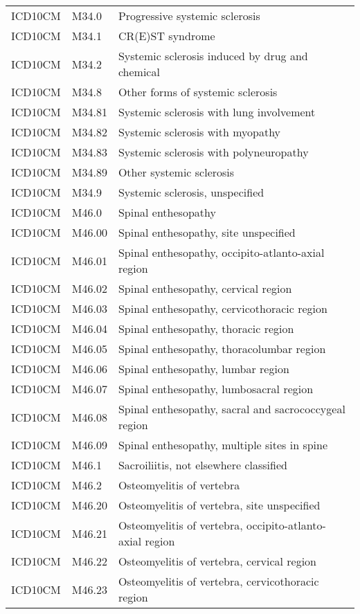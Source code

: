 \begin{table}[ht]
\begin{tabular}{lll}
  ICD10CM & M34.0 & Progressive systemic sclerosis \\ 
  ICD10CM & M34.1 & CR(E)ST syndrome \\ 
  ICD10CM & M34.2 & Systemic sclerosis induced by drug and chemical \\ 
  ICD10CM & M34.8 & Other forms of systemic sclerosis \\ 
  ICD10CM & M34.81 & Systemic sclerosis with lung involvement \\ 
  ICD10CM & M34.82 & Systemic sclerosis with myopathy \\ 
  ICD10CM & M34.83 & Systemic sclerosis with polyneuropathy \\ 
  ICD10CM & M34.89 & Other systemic sclerosis \\ 
  ICD10CM & M34.9 & Systemic sclerosis, unspecified \\ 
  ICD10CM & M46.0 & Spinal enthesopathy \\ 
  ICD10CM & M46.00 & Spinal enthesopathy, site unspecified \\ 
  ICD10CM & M46.01 & Spinal enthesopathy, occipito-atlanto-axial region \\ 
  ICD10CM & M46.02 & Spinal enthesopathy, cervical region \\ 
  ICD10CM & M46.03 & Spinal enthesopathy, cervicothoracic region \\ 
  ICD10CM & M46.04 & Spinal enthesopathy, thoracic region \\ 
  ICD10CM & M46.05 & Spinal enthesopathy, thoracolumbar region \\ 
  ICD10CM & M46.06 & Spinal enthesopathy, lumbar region \\ 
  ICD10CM & M46.07 & Spinal enthesopathy, lumbosacral region \\ 
  ICD10CM & M46.08 & Spinal enthesopathy, sacral and sacrococcygeal region \\ 
  ICD10CM & M46.09 & Spinal enthesopathy, multiple sites in spine \\ 
  ICD10CM & M46.1 & Sacroiliitis, not elsewhere classified \\ 
  ICD10CM & M46.2 & Osteomyelitis of vertebra \\ 
  ICD10CM & M46.20 & Osteomyelitis of vertebra, site unspecified \\ 
  ICD10CM & M46.21 & Osteomyelitis of vertebra, occipito-atlanto-axial region \\ 
  ICD10CM & M46.22 & Osteomyelitis of vertebra, cervical region \\ 
  ICD10CM & M46.23 & Osteomyelitis of vertebra, cervicothoracic region \\ 

\end{tabular}
\end{table}
